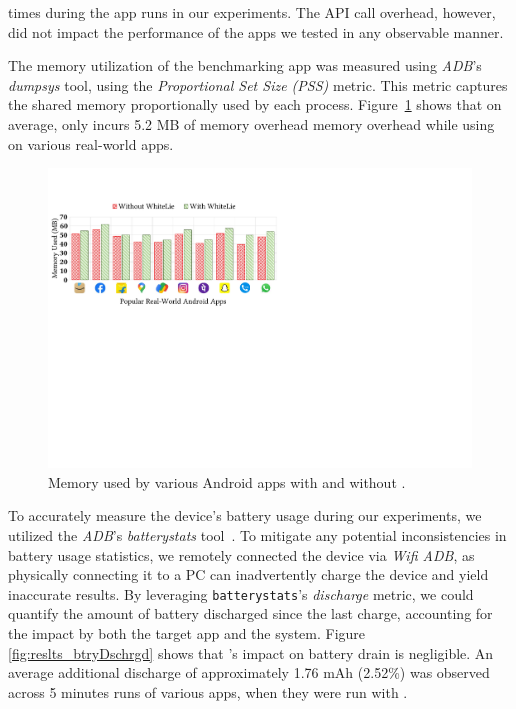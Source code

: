 \noindent times during the app runs in our experiments. The API call overhead, however, did not impact the performance of the apps we tested in any observable manner. 

The memory utilization of the benchmarking app was measured using \textit{ADB}'s \textit{dumpsys} tool, using the \textit{Proportional Set Size (PSS)} metric. This metric captures the shared memory proportionally used by each process. Figure~\ref{fig:results_memUsedAll} shows that on average, \framework{} only incurs 5.2 MB of memory overhead memory overhead while using \framework{} on various real-world apps.

\begin{figure}[t]
    \centering
    \includegraphics[width=0.8\linewidth]{Figures/Performance Evaluation/results_memory_used_target_app_real_world_apps.pdf}
    \caption{Memory used by various Android apps with and without \framework{}.}
    \label{fig:results_memUsedAll}
\end{figure}

To accurately measure the device's battery usage during our experiments, we utilized the \textit{ADB}'s \textit{batterystats} tool~\cite{batterystats}. 
To mitigate any potential inconsistencies in battery usage statistics, we remotely connected the device via \textit{Wifi ADB}, as physically connecting it to a PC can inadvertently charge the device and yield inaccurate results.  By leveraging \texttt{batterystats}'s \textit{discharge} metric, we could quantify the amount of battery discharged since the last charge, accounting for the impact by both the target app and the system. Figure \ref{fig:reslts_btryDschrgd} shows that \framework{}'s impact on battery drain is negligible. An average additional discharge of approximately 1.76 mAh (2.52\%) was observed across 5 minutes runs of various apps, when they were run with \framework{}.

